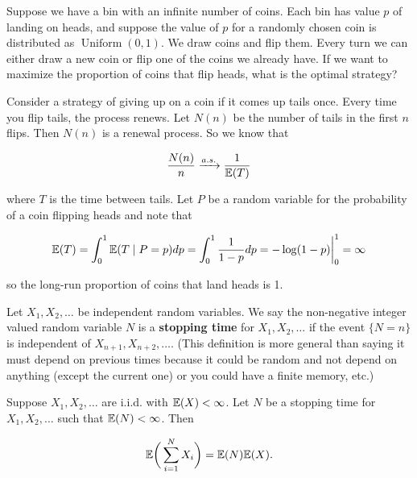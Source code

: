 \begin{example} Suppose we have a bin with an infinite number of coins. Each bin has value \(p\) of landing on heads, and suppose the value of \(p\) for a randomly chosen coin is distributed as \(\operatorname{Uniform}(0,1)\). We draw coins and flip them. Every turn we can either draw a new coin or flip one of the coins we already have. If we want to maximize the proportion of coins that flip heads, what is the optimal strategy?

\begin{solution} Consider a strategy of giving up on a coin if it comes up tails once. Every time you flip tails, the process renews. Let \(N(n)\) be the number of tails in the first \(n\) flips. Then \(N(n)\) is a renewal process. So we know that

\[
\frac{N(n)}{n} \xrightarrow{a.s.} \frac{1}{\E(T)}
\]

where \(T\) is the time between tails. Let \(P\) be a random variable for the probability of a coin flipping heads and note that

\[
\E(T) = \int_0^1 \E(T \mid P=p) dp = \int_0^1 \frac{1}{1-p} dp = - \log(1-p) \bigg|_0^1 = \infty
\]

so the long-run proportion of coins that land heads is 1.

\end{solution}

\end{example}

\begin{definition} Let \(X_1, X_2, \ldots\) be independent random variables. We say the non-negative integer valued random variable \(N\) is a \textbf{stopping time} for \(X_1, X_2, \ldots\) if the event \(\{ N = n\}\) is independent of \(X_{n+1}, X_{n+2}, \ldots\). (This definition is more general than saying it must depend on previous times because it could be random and not depend on anything (except the current one) or you could have a finite memory, etc.)

\end{definition}

\begin{theorem}\label{stoch.wald.eqn}Suppose \(X_1, X_2, \ldots\) are i.i.d. with \(\E(X) < \infty\). Let \(N\) be a stopping time for \(X_1, X_2, \ldots\) such that \(\E(N) < \infty\). Then

\[
\E \bigg( \sum_{i=1}^N X_i \bigg) = \E(N) \E(X).
\]

\end{theorem}


